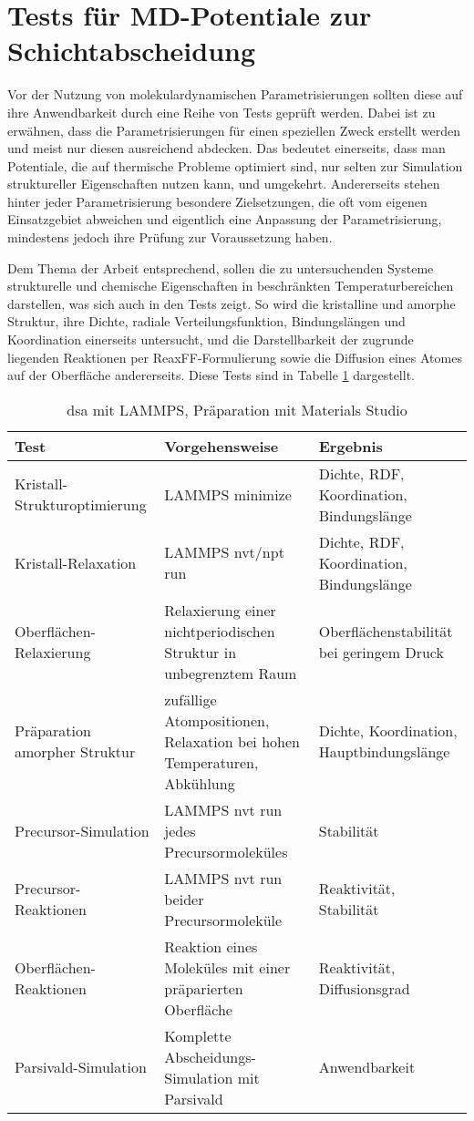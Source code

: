\section{Tests für MD-Potentiale zur Schichtabscheidung}

Vor der Nutzung von molekulardynamischen Parametrisierungen sollten diese auf ihre Anwendbarkeit durch eine Reihe von Tests geprüft werden.
Dabei ist zu erwähnen, dass die Parametrisierungen für einen speziellen Zweck erstellt werden und meist nur diesen ausreichend abdecken.
Das bedeutet einerseits, dass man Potentiale, die auf thermische Probleme optimiert sind, nur selten zur Simulation struktureller Eigenschaften nutzen kann, und umgekehrt.
Andererseits stehen hinter jeder Parametrisierung besondere Zielsetzungen, die oft vom eigenen Einsatzgebiet abweichen und eigentlich eine Anpassung der Parametrisierung, mindestens jedoch ihre Prüfung zur Voraussetzung haben.

Dem Thema der Arbeit entsprechend, sollen die zu untersuchenden Systeme strukturelle und chemische Eigenschaften in beschränkten Temperaturbereichen darstellen, was sich auch in den Tests zeigt.
So wird die kristalline und amorphe Struktur, ihre Dichte, radiale Verteilungsfunktion, Bindungslängen und Koordination einerseits untersucht, und die Darstellbarkeit der zugrunde liegenden Reaktionen per ReaxFF-Formulierung sowie die Diffusion eines Atomes auf der Oberfläche andererseits.
Diese Tests sind in Tabelle \ref{tab:mdtestvariants} dargestellt.

\begin{table}[bhtp]
  \begin{tabularx}{\textwidth}{|lXX|}
    \hline
    \textbf{Test} & \textbf{Vorgehensweise} & \textbf{Ergebnis} \\
    \hline
    Kristall-Strukturoptimierung & LAMMPS minimize & Dichte, RDF, Koordination, Bindungslänge \\
    Kristall-Relaxation & LAMMPS nvt/npt run & Dichte, RDF, Koordination, Bindungslänge \\
    Oberflächen-Relaxierung & Relaxierung einer nichtperiodischen Struktur in unbegrenztem Raum  & Oberflächenstabilität bei geringem Druck \\
    Präparation amorpher Struktur & zufällige Atompositionen, Relaxation bei hohen Temperaturen, Abkühlung & Dichte, Koordination, Hauptbindungslänge \\
    Precursor-Simulation & LAMMPS nvt run jedes Precursormoleküles & Stabilität \\
    Precursor-Reaktionen & LAMMPS nvt run beider Precursormoleküle & Reaktivität, Stabilität \\
    Oberflächen-Reaktionen & Reaktion eines Moleküles mit einer präparierten Oberfläche & Reaktivität, Diffusionsgrad \\
    Parsivald-Simulation & Komplette Abscheidungs-Simulation mit Parsivald & Anwendbarkeit \\
    \hline
  \end{tabularx}
  \caption[asd]{dsa mit LAMMPS, Präparation mit Materials Studio}
  \label{tab:mdtestvariants}
\end{table}
